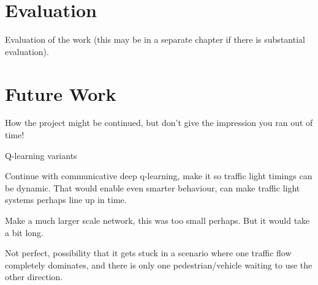 \documentclass[a4paper]{report}
\begin{document}
\section{Evaluation}
Evaluation of the work (this may be in a separate chapter if there is substantial evaluation).

\section{Future Work}
How the project might be continued, but don't give the impression you ran out of time!

Q-learning variants

Continue with communicative deep q-learning, make it so traffic light timings can be dynamic. That would enable even smarter behaviour, can make traffic light systems perhaps line up in time.

Make a much larger scale network, this was too small perhaps. But it would take a bit long.

Not perfect, possibility that it gets stuck in a scenario where one traffic flow completely dominates, and there is only one pedestrian/vehicle waiting to use the other direction.

\appendix
\end{document}
